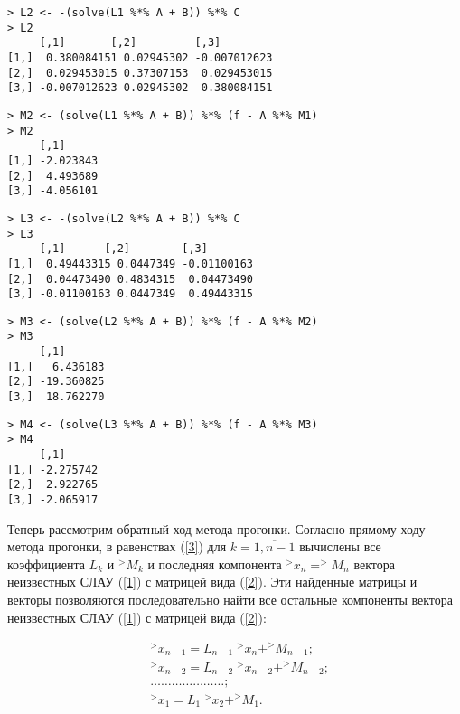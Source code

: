\documentclass[14pt,a4paper]{scrartcl}
\begin{document}
\begin{verbatim}
> L2 <- -(solve(L1 %*% A + B)) %*% C
> L2
     [,1]       [,2]         [,3]
[1,]  0.380084151 0.02945302 -0.007012623
[2,]  0.029453015 0.37307153  0.029453015
[3,] -0.007012623 0.02945302  0.380084151
\end{verbatim}


\begin{verbatim}
> M2 <- (solve(L1 %*% A + B)) %*% (f - A %*% M1)
> M2
     [,1]
[1,] -2.023843
[2,]  4.493689
[3,] -4.056101
\end{verbatim}



\begin{verbatim}
> L3 <- -(solve(L2 %*% A + B)) %*% C
> L3
     [,1]      [,2]        [,3]
[1,]  0.49443315 0.0447349 -0.01100163
[2,]  0.04473490 0.4834315  0.04473490
[3,] -0.01100163 0.0447349  0.49443315
\end{verbatim}


\begin{verbatim}
> M3 <- (solve(L2 %*% A + B)) %*% (f - A %*% M2)
> M3
     [,1]
[1,]   6.436183
[2,] -19.360825
[3,]  18.762270
\end{verbatim}


\begin{verbatim}
> M4 <- (solve(L3 %*% A + B)) %*% (f - A %*% M3)
> M4
     [,1]
[1,] -2.275742
[2,]  2.922765
[3,] -2.065917
\end{verbatim}

\pagebreak

Теперь рассмотрим обратный ход метода прогонки. Согласно прямому ходу метода прогонки, в равенствах (\ref{3}) для $k = \overline{1, n-1}$ вычислены все коэффициента $L_k$ и $^>M_k$ и последняя компонента $^>x_n = ^>M_n$ вектора неизвестных СЛАУ (\ref{1}) с матрицей вида (\ref{2}). Эти найденные матрицы и векторы позволяются последовательно найти все остальные компоненты вектора неизвестных СЛАУ (\ref{1}) с матрицей вида (\ref{2}):

\begin{equation*}
	\begin{aligned}
	&^>x_{n-1}=L_{n-1}\; ^{>}x_{n}+ ^{>}M_{n-1};\\
	&^>x_{n-2}=L_{n-2}\; ^{>}x_{n-2}+ ^{>}M_{n-2};\\
	& \ldots\ldots\ldots\ldots\ldots\ldots\ldots;\\
	&^>x_{1}=L_{1}\; ^{>}x_{2}+ ^{>}M_{1}.
	\end{aligned}
\end{equation*}
\end{document}
